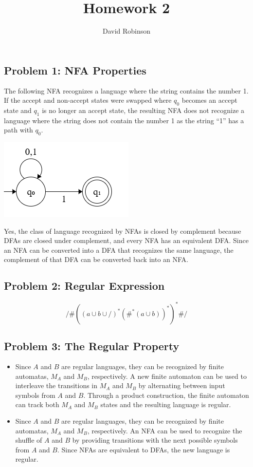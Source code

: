 \documentclass{article}
\title{Homework 2}
\author{David Robinson}
\date{}
\begin{document}
\maketitle

\subsection*{Problem 1: NFA Properties}
The following NFA recognizes a language where the string contains the number 1. If the accept and non-accept states were swapped where $q_0$ becomes an accept state and $q_1$ is no longer an accept state, the resulting NFA does not recognize a language where the string does not contain the number 1 as the string ``1'' has a path with $q_0$.

\begin{center}
    \includegraphics[scale=0.65]{nfa.png}
\end{center}

Yes, the class of language recognized by NFAs is closed by complement because DFAs are closed under complement, and every NFA has an equivalent DFA. Since an NFA can be converted into a DFA that recognizes the same language, the complement of that DFA can be converted back into an NFA.

\subsection*{Problem 2: Regular Expression}

\[/\#{({(a\cup b\cup /)}^*{(\#^*(a\cup b))}^*)}^* \#/\]

\subsection*{Problem 3: The Regular Property}

\begin{itemize}
    \item Since $A$ and $B$ are regular languages, they can be recognized by finite automatas, $M_A$ and $M_B$, respectively. A new finite automaton can be used to interleave the transitions in $M_A$ and $M_B$ by alternating between input symbols from $A$ and $B$. Through a product construction, the finite automaton can track both $M_A$ and $M_B$ states and the resulting language is regular.
    \item Since $A$ and $B$ are regular languages, they can be recognized by finite automatas, $M_A$ and $M_B$, respectively. An NFA can be used to recognize the shuffle of $A$ and $B$ by providing transitions with the next possible symbols from $A$ and $B$. Since NFAs are equivalent to DFAs, the new language is regular.
\end{itemize}
\end{document}
